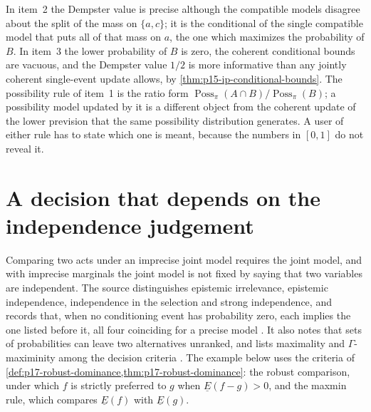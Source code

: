 In item~2 the Dempster value is precise although the compatible models
disagree about the split of the mass on \(\{a,c\}\); it is the conditional
of the single compatible model that puts all of that mass on \(a\), the one
which maximizes the probability of \(B\). In item~3 the lower probability
of \(B\) is zero, the coherent conditional bounds are vacuous, and the
Dempster value \(1/2\) is more informative than any jointly coherent
single-event update allows, by \cref{thm:p15-ip-conditional-bounds}. The
possibility rule of item~1 is the ratio form
\(\operatorname{Poss}_\pi(A\cap B)/\operatorname{Poss}_\pi(B)\); a
possibility model updated by it is a different object from the coherent
update of the lower prevision that the same possibility distribution
generates. A user of either rule has to state which one is meant, because
the numbers in \([0,1]\) do not reveal it.

\section{A decision that depends on the independence judgement}
\label{sec:p15-w02b-p15-034-independence-decision}

Comparing two acts under an imprecise joint model requires the joint model,
and with imprecise marginals the joint model is not fixed by saying that two
variables are independent. The source distinguishes epistemic irrelevance,
epistemic independence, independence in the selection and strong
independence, and records that, when no conditioning event has probability
zero, each implies the one listed before it, all four coinciding for a
precise model \cite[§4, pp.~25--30]{MirandaCoherentLowerPrevisionsCapture}.
It also notes that sets of probabilities can leave two alternatives
unranked, and lists maximality and \(\Gamma\)-maximinity among the decision
criteria \cite[§6, p.~37]{MirandaCoherentLowerPrevisionsCapture}. The
example below uses the criteria of
\cref{def:p17-robust-dominance,thm:p17-robust-dominance}: the robust
comparison, under which \(f\) is strictly preferred to \(g\) when
\(\underline E(f-g)>0\), and the maxmin rule, which compares
\(\underline E(f)\) with \(\underline E(g)\).

